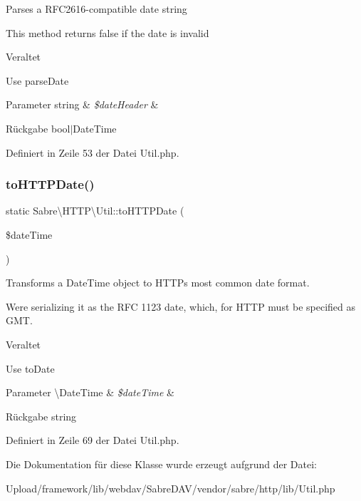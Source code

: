 Parses a R\+F\+C2616-\/compatible date string

This method returns false if the date is invalid

\begin{DoxyRefDesc}{Veraltet}
\item[\mbox{\hyperlink{deprecated__deprecated000059}{Veraltet}}]Use parse\+Date \end{DoxyRefDesc}

\begin{DoxyParams}[1]{Parameter}
string & {\em \$date\+Header} & \\
\hline
\end{DoxyParams}
\begin{DoxyReturn}{Rückgabe}
bool$\vert$\+Date\+Time 
\end{DoxyReturn}


Definiert in Zeile 53 der Datei Util.\+php.

\mbox{\label{class_sabre_1_1_h_t_t_p_1_1_util_af5a70c07fd3dab23788af555aa107b78}} 
\subsubsection{\texorpdfstring{to\+H\+T\+T\+P\+Date()}{toHTTPDate()}}
{\footnotesize\ttfamily static Sabre\textbackslash{}\+H\+T\+T\+P\textbackslash{}\+Util\+::to\+H\+T\+T\+P\+Date (\begin{DoxyParamCaption}\item[{\textbackslash{}Date\+Time}]{\$date\+Time }\end{DoxyParamCaption})\hspace{0.3cm}{\ttfamily [static]}}

Transforms a Date\+Time object to H\+T\+TP\textquotesingle{}s most common date format.

We\textquotesingle{}re serializing it as the R\+FC 1123 date, which, for H\+T\+TP must be specified as G\+MT.

\begin{DoxyRefDesc}{Veraltet}
\item[\mbox{\hyperlink{deprecated__deprecated000060}{Veraltet}}]Use to\+Date \end{DoxyRefDesc}

\begin{DoxyParams}[1]{Parameter}
\textbackslash{}\+Date\+Time & {\em \$date\+Time} & \\
\hline
\end{DoxyParams}
\begin{DoxyReturn}{Rückgabe}
string 
\end{DoxyReturn}


Definiert in Zeile 69 der Datei Util.\+php.



Die Dokumentation für diese Klasse wurde erzeugt aufgrund der Datei\+:\begin{DoxyCompactItemize}
\item 
Upload/framework/lib/webdav/\+Sabre\+D\+A\+V/vendor/sabre/http/lib/Util.\+php\end{DoxyCompactItemize}
